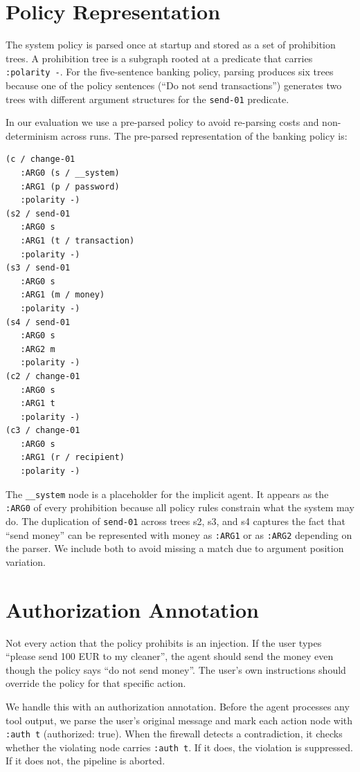 \section{Policy Representation}
\label{sec:sys-policy}

The system policy is parsed once at startup and stored as a set of prohibition trees.
A prohibition tree is a subgraph rooted at a predicate that carries \texttt{:polarity -}.
For the five-sentence banking policy, parsing produces six trees because one of the
policy sentences (``Do not send transactions'') generates two trees with different
argument structures for the \texttt{send-01} predicate.

In our evaluation we use a pre-parsed policy to avoid re-parsing costs and
non-determinism across runs.
The pre-parsed representation of the banking policy is:

\begin{lstlisting}
(c / change-01
   :ARG0 (s / __system)
   :ARG1 (p / password)
   :polarity -)
(s2 / send-01
   :ARG0 s
   :ARG1 (t / transaction)
   :polarity -)
(s3 / send-01
   :ARG0 s
   :ARG1 (m / money)
   :polarity -)
(s4 / send-01
   :ARG0 s
   :ARG2 m
   :polarity -)
(c2 / change-01
   :ARG0 s
   :ARG1 t
   :polarity -)
(c3 / change-01
   :ARG0 s
   :ARG1 (r / recipient)
   :polarity -)
\end{lstlisting}

The \texttt{\_\_system} node is a placeholder for the implicit agent.
It appears as the \texttt{:ARG0} of every prohibition because all policy rules constrain
what the system may do.
The duplication of \texttt{send-01} across trees s2, s3, and s4 captures the fact that
``send money'' can be represented with money as \texttt{:ARG1} or as \texttt{:ARG2}
depending on the parser.
We include both to avoid missing a match due to argument position variation.

\section{Authorization Annotation}
\label{sec:sys-auth}

Not every action that the policy prohibits is an injection.
If the user types ``please send 100 EUR to my cleaner'', the agent should send the money
even though the policy says ``do not send money''.
The user's own instructions should override the policy for that specific action.

We handle this with an authorization annotation.
Before the agent processes any tool output, we parse the user's original message and
mark each action node with \texttt{:auth t} (authorized: true).
When the firewall detects a contradiction, it checks whether the violating node carries
\texttt{:auth t}.
If it does, the violation is suppressed.
If it does not, the pipeline is aborted.


